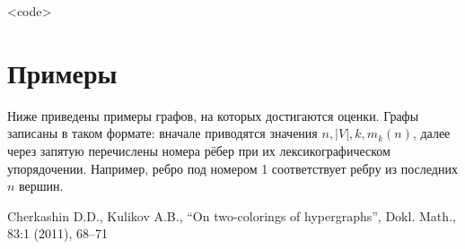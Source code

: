 \documentclass{article}
\begin{document}
    <code>

    \section{Примеры}
    Ниже приведены примеры графов, на которых достигаются оценки. Графы записаны в таком формате: вначале приводятся значения $n, |V|, k, m_k(n)$, далее через запятую перечислены номера рёбер при их лексикографическом упорядочении. Например, ребро под номером 1 соответствует ребру из последних $n$ вершин. 
            
    \begin{thebibliography}{9} 
				
		 Cherkashin D.D., Kulikov A.B., “On two-colorings of hypergraphs”, Dokl. Math., 83:1 (2011), 68–71
				
	\end{thebibliography}
\end{document}
